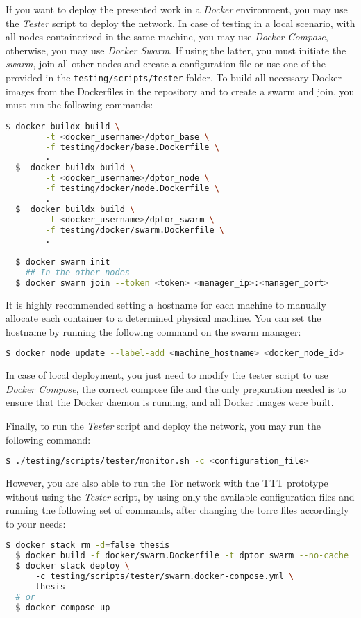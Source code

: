 If you want to deploy the presented work in a \textit{Docker} environment, you may use the \textit{Tester} script to deploy the network. In case of testing in a local scenario, with all nodes containerized in the same machine, you may use \textit{Docker Compose}, otherwise, you may use \textit{Docker Swarm}. If using the latter, you must initiate the \textit{swarm}, join all other nodes and create a configuration file or use one of the provided in the \texttt{testing/scripts/tester} folder. 
To build all necessary Docker images from the Dockerfiles in the repository and to create a swarm and join, you must run the following commands:
\begin{lstlisting}[language=bash]
  $ docker buildx build \
        -t <docker_username>/dptor_base \
        -f testing/docker/base.Dockerfile \
        .
  $  docker buildx build \
        -t <docker_username>/dptor_node \
        -f testing/docker/node.Dockerfile \
        .
  $  docker buildx build \
        -t <docker_username>/dptor_swarm \
        -f testing/docker/swarm.Dockerfile \
        .

  $ docker swarm init 
    ## In the other nodes
  $ docker swarm join --token <token> <manager_ip>:<manager_port>  
\end{lstlisting}

It is highly recommended setting a hostname for each machine to manually allocate each container to a determined physical machine. You can set the hostname by running the following command on the swarm manager:  
\begin{lstlisting}[language=bash]
  $ docker node update --label-add <machine_hostname> <docker_node_id>
\end{lstlisting}

In case of local deployment, you just need to modify the tester script to use \textit{Docker Compose}, the correct compose file and the only preparation needed is to ensure that the Docker daemon is running, and all Docker images were built.

Finally, to run the \textit{Tester} script and deploy the network, you may run the following command:
\begin{lstlisting}[language=bash]
  $ ./testing/scripts/tester/monitor.sh -c <configuration_file>
\end{lstlisting}

However, you are also able to run the Tor network with the TTT prototype without using the \textit{Tester} script, by using only the available configuration files and running the following set of commands, after changing the torrc files accordingly to your needs:  
\begin{lstlisting}[language=bash]
  $ docker stack rm -d=false thesis
  $ docker build -f docker/swarm.Dockerfile -t dptor_swarm --no-cache . 
  $ docker stack deploy \ 
      -c testing/scripts/tester/swarm.docker-compose.yml \
      thesis
  # or 
  $ docker compose up 
\end{lstlisting}

